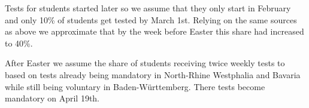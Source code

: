 %
%
%



Tests for students started later so we assume that they only start in February and only
10\% of students get tested by March 1st. Relying on the same sources as above we
approximate that by the week before Easter this share had increased to 40\%.

After Easter we assume the share of students receiving twice weekly tests to based on
tests already being mandatory in North-Rhine Westphalia and Bavaria while still being
voluntary in Baden-Württemberg. There tests become mandatory on April 19th.













